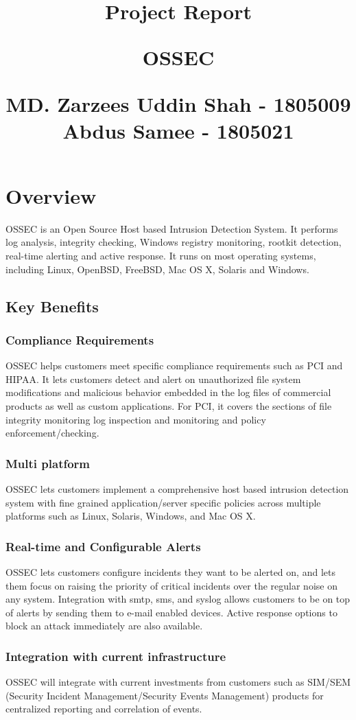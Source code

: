 \documentclass{article}
\title{%
  \begin{center}
        \vspace*{1cm}
                    
        \vspace{3cm}
        \LARGE
        Project Report
            
        \vspace{1.5cm}
            
        \textbf{OSSEC}
                        
        \vspace{0.8cm}
                        
        \Large
        MD. Zarzees Uddin Shah - 1805009\\
        Abdus Samee - 1805021\\
    \end{center}
  }
\date{}
\begin{document}
\maketitle
\newpage
\section{Overview}
OSSEC is an Open Source Host based Intrusion Detection System. It performs log analysis, integrity checking, Windows registry monitoring, rootkit detection, real-time alerting and active response. It runs on most operating systems, including Linux, OpenBSD, FreeBSD, Mac OS X, Solaris and Windows. 
\subsection{Key Benefits}
\subsubsection{Compliance Requirements}
OSSEC helps customers meet specific compliance requirements such as PCI and HIPAA. It lets customers detect and alert on unauthorized file system modifications and malicious behavior embedded in the log files of commercial products as well as custom applications. For PCI, it covers the sections of file integrity monitoring  log inspection and monitoring  and policy enforcement/checking.
\subsubsection{Multi platform}
OSSEC lets customers implement a comprehensive host based intrusion detection system with fine grained application/server specific policies across multiple platforms such as Linux, Solaris, Windows, and Mac OS X.
\subsubsection{Real-time and Configurable Alerts}
OSSEC lets customers configure incidents they want to be alerted on, and lets them focus on raising the priority of critical incidents over the regular noise on any system. Integration with smtp, sms, and syslog allows customers to be on top of alerts by sending them to e-mail enabled devices. Active response options to block an attack immediately are also available.
\subsubsection{Integration with current infrastructure}
OSSEC will integrate with current investments from customers such as SIM/SEM (Security Incident Management/Security Events Management) products for centralized reporting and correlation of events.
\end{document}
